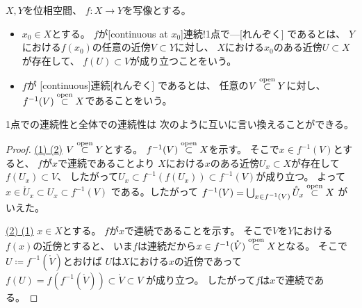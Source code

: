 \documentclass[report]{jlreq}
\begin{document}
\begin{definition}[連続写像]
    $X, Y$を位相空間、
    $f \colon X \to Y$を写像とする。
    \begin{itemize}
        \item $x_0 \in X$とする。
            $f$が[continuous at $x_0$]{連続!1点で---}[れんぞく]
            であるとは、
            $Y$における$f(x_0)$の任意の近傍$V \subset Y$に対し、
            $X$における$x_0$のある近傍$U \subset X$が存在して、
            $f(U) \subset V$が成り立つことをいう。
        \item $f$が
            [continuous]{連続}[れんぞく]
            であるとは、
            任意の$V \stackrel{\text{open}}{\subset} Y$に対し、
            $f^{-1}(V) \stackrel{\text{open}}{\subset} X$であることをいう。
    \end{itemize}
\end{definition}

1点での連続性と全体での連続性は
次のように互いに言い換えることができる。


\begin{proof}
    \uline{(1) \Rightarrow (2)} \quad
    $V \stackrel{\text{open}}{\subset} Y$とする。
    $f^{-1}(V) \stackrel{\text{open}}{\subset} X$を示す。
    そこで$x \in f^{-1}(V)$とすると、
    $f$が$x$で連続であることより
    $X$における$x$のある近傍$U_x \subset X$が存在して
    $f(U_x) \subset V$、
    したがって$U_x \subset f^{-1}(f(U_x)) \subset f^{-1}(V)$が成り立つ。
    よって
    $x \in \mathring{U}_x
        \subset U_x
        \subset f^{-1}(V)$
    である。したがって
    $f^{-1}(V)
        = \bigcup_{x \in f^{-1}(V)} \mathring{U}_x
        \stackrel{\text{open}}{\subset} X$
    がいえた。

    \uline{(2) \Rightarrow (1)} \quad
    $x \in X$とする。
    $f$が$x$で連続であることを示す。
    そこで$V$を$Y$における$f(x)$の近傍とすると、
    いま$f$は連続だから$x \in f^{-1}(\mathring{V}) \stackrel{\text{open}}{\subset} X$となる。
    そこで$U \coloneqq f^{-1}(\mathring{V})$とおけば
    $U$は$X$における$x$の近傍であって
    $f(U) = f(f^{-1}(\mathring{V}))
        \subset \mathring{V}
        \subset V$
    が成り立つ。
    したがって$f$は$x$で連続である。
\end{proof}
\end{document}
